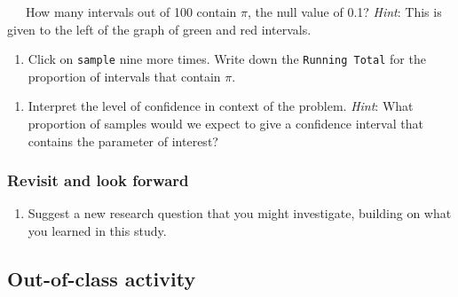 \documentclass[
]{report}
\providecommand{\tightlist}{%
  \setlength{\itemsep}{0pt}\setlength{\parskip}{0pt}}
\begin{document}
\vspace{0.5in}

~~~How many intervals out of 100 contain \(\pi\), the null value of 0.1? \emph{Hint}: This is given to the left of the graph of green and red intervals.

\vspace{0.5in}

\begin{enumerate}
\def\labelenumi{\arabic{enumi}.}
\setcounter{enumi}{16}
\tightlist
\item
  Click on \texttt{sample} nine more times. Write down the \texttt{Running\ Total} for the proportion of intervals that contain \(\pi\).
\end{enumerate}

\vspace{0.5in}

\begin{enumerate}
\def\labelenumi{\arabic{enumi}.}
\setcounter{enumi}{17}
\tightlist
\item
  Interpret the level of confidence in context of the problem. \emph{Hint}: What proportion of samples would we expect to give a confidence interval that contains the parameter of interest?
\end{enumerate}

\vspace{1in}

\hypertarget{revisit-and-look-forward-1}{%
\subsubsection*{Revisit and look forward}\label{revisit-and-look-forward-1}}

\begin{enumerate}
\def\labelenumi{\arabic{enumi}.}
\setcounter{enumi}{18}
\tightlist
\item
  Suggest a new research question that you might investigate, building on what you learned in this study.
\end{enumerate}

\vspace{.6in}

\hypertarget{out-of-class-activity-6}{%
\subsection{Out-of-class activity}\label{out-of-class-activity-6}}
\end{document}
